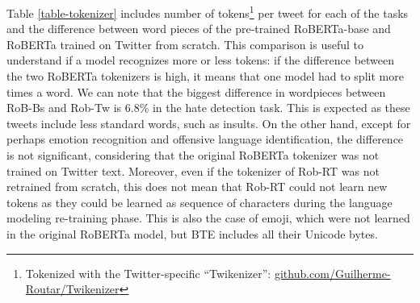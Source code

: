 \documentclass[11pt,a4paper]{article}
\begin{document}
Table \ref{table-tokenizer} includes number of tokens\footnote{Tokenized with the Twitter-specific ``Twikenizer'': \url{github.com/Guilherme-Routar/Twikenizer}} per tweet for each of the tasks and the difference between word pieces of the pre-trained RoBERTa-base and RoBERTa trained on Twitter from scratch.
This comparison is useful to understand if a model recognizes more or less tokens: if the difference between the two RoBERTa tokenizers is high, it means that one model had to split more times a word.
We can note that the biggest difference in wordpieces between RoB-Bs and Rob-Tw is 6.8\% in the hate detection task. This is expected as these tweets include less standard words, such as insults. On the other hand, except for perhaps emotion recognition and offensive language identification, the difference is not significant, considering that the original RoBERTa tokenizer was not trained on Twitter text. Moreover, even if the tokenizer of Rob-RT was not retrained from scratch, this does not mean that Rob-RT could not learn new tokens as they could be learned as sequence of characters during the language modeling re-training phase. This is also the case of emoji, which were not learned in the original RoBERTa model, but BTE includes all their Unicode bytes. 
\end{document}
